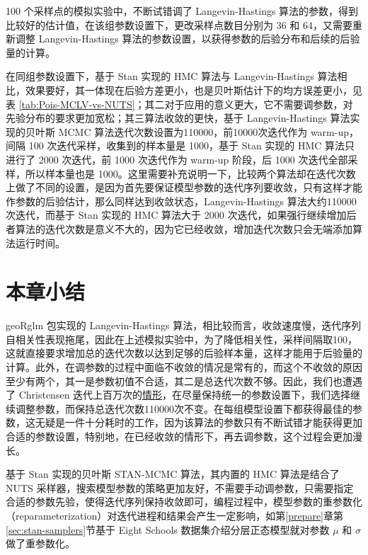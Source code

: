 \documentclass[12pt,a4paper,UTF8,twoside]{book}
\theoremstyle{definition}
\theoremstyle{definition}
\theoremstyle{definition}
\theoremstyle{remark}
\begin{document}
100 个采样点的模拟实验中，不断试错调了 Langevin-Hastings
算法的参数，得到比较好的估计值，在该组参数设置下，更改采样点数目分别为
36 和 64，又需要重新调整 Langevin-Hastings
算法的参数设置，以获得参数的后验分布和后续的后验量的计算。

在同组参数设置下，基于 Stan 实现的 HMC 算法与 Langevin-Hastings
算法相比，效果要好，其一体现在后验方差更小，也是贝叶斯估计下的均方误差更小，见表
\ref{tab:Pois-MCLV-vs-NUTS}；其二对于应用的意义更大，它不需要调参数，对先验分布的要求更加宽松；其三算法收敛的更快，基于
Langevin-Hastings 算法实现的贝叶斯 MCMC
算法迭代次数设置为110000，前10000次迭代作为 warm-up，间隔 100
次迭代采样，收集到的样本量是 1000，基于 Stan 实现的 HMC 算法只进行了
2000 次迭代，前 1000 次迭代作为 warm-up 阶段，后 1000
次迭代全部采样，所以样本量也是
1000。这里需要补充说明一下，比较两个算法却在迭代次数上做了不同的设置，是因为首先要保证模型参数的迭代序列要收敛，只有这样才能作参数的后验估计，那么同样达到收敛状态，Langevin-Hastings
算法大约110000次迭代，而基于 Stan 实现的 HMC 算法大于 2000
次迭代，如果强行继续增加后者算法的迭代次数是意义不大的，因为它已经收敛，增加迭代次数只会无端添加算法运行时间。

\hypertarget{sec:simulations}{%
\section{本章小结}\label{sec:simulations}}

geoRglm 包实现的 Langevin-Hastings
算法，相比较而言，收敛速度慢，迭代序列自相关性表现拖尾，因此在上述模拟实验中，为了降低相关性，采样间隔取100，这就直接要求增加总的迭代次数以达到足够的后验样本量，这样才能用于后验量的计算。此外，在调参数的过程中面临不收敛的情况是常有的，而这个不收敛的原因至少有两个，其一是参数初值不合适，其二是总迭代次数不够。因此，我们也遭遇了
Christensen
迭代上百万次的\href{http://gbi.agrsci.dk/~ofch/geoRglm/Intro/books.html}{情形}，在尽量保持统一的参数设置下，我们选择继续调整参数，而保持总迭代次数110000次不变。在每组模型设置下都获得最佳的参数，这无疑是一件十分耗时的工作，因为该算法的参数只有不断试错才能获得更加合适的参数设置，特别地，在已经收敛的情形下，再去调参数，这个过程会更加漫长。

基于 Stan 实现的贝叶斯 STAN-MCMC 算法，其内置的 HMC 算法是结合了 NUTS
采样器\citep{hoffman2014}，搜索模型参数的策略更加友好，不需要手动调参数，只需要指定合适的参数先验，使得迭代序列保持收敛即可，编程过程中，模型参数的重参数化（reparameterization）对迭代进程和结果会产生一定影响，如第\ref{prepare}章第\ref{sec:stan-samplers}节基于
Eight Schools 数据集介绍分层正态模型就对参数 \(\mu\) 和 \(\sigma\)
做了重参数化。
\end{document}
